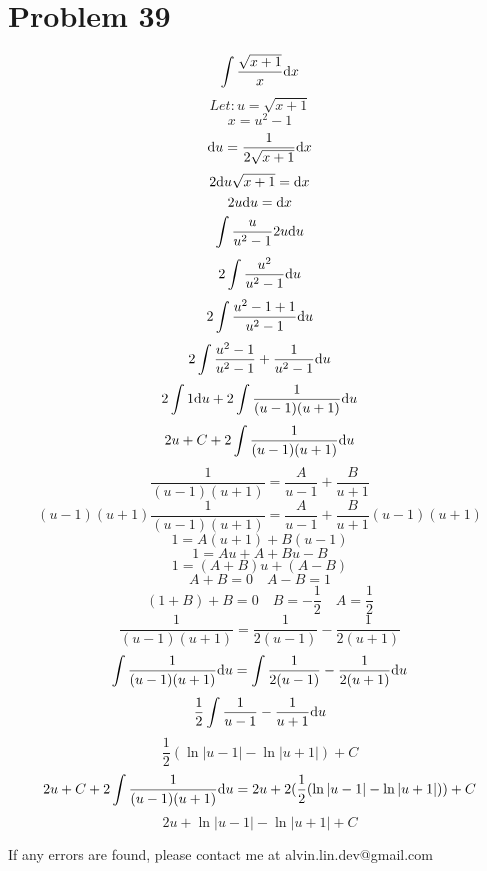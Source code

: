 \documentclass[letterpaper, 12pt]{math}
\begin{document}
\section*{Problem 39}
\[ \int{\frac{\sqrt{x+1}}{x}\mathrm{d}{x}} \]
\[ Let: u = \sqrt{x+1} \]
\[ x = u^{2}-1 \]
\[ \mathrm{d}{u} = \frac{1}{2\sqrt{x+1}}\mathrm{d}{x} \]
\[ 2\mathrm{d}{u}\sqrt{x+1} = \mathrm{d}{x} \]
\[ 2u\mathrm{d}{u} = \mathrm{d}{x} \]
\[ \int{\frac{u}{u^{2}-1}2u\mathrm{d}{u}} \]
\[ 2\int{\frac{u^{2}}{u^{2}-1}\mathrm{d}{u}} \]
\[ 2\int{\frac{u^{2}-1+1}{u^{2}-1}\mathrm{d}{u}} \]
\[ 2\int{\frac{u^{2}-1}{u^{2}-1}+\frac{1}{u^{2}-1}\mathrm{d}{u}} \]
\[ 2\int{1\mathrm{d}{u}}+2\int{\frac{1}{(u-1)(u+1)}\mathrm{d}{u}} \]
\[ 2u+C+2\int{\frac{1}{(u-1)(u+1)}\mathrm{d}{u}} \]
\[ \frac{1}{(u-1)(u+1)} = \frac{A}{u-1}+\frac{B}{u+1} \]
\[ (u-1)(u+1)\frac{1}{(u-1)(u+1)} = \frac{A}{u-1}+\frac{B}{u+1}(u-1)(u+1) \]
\[ 1 = A(u+1)+B(u-1) \]
\[ 1 = Au+A+Bu-B \]
\[ 1 = (A+B)u+(A-B) \]
\[ A+B = 0 \quad A-B = 1 \]
\[ (1+B)+B = 0 \quad B = -\frac{1}{2} \quad A = \frac{1}{2} \]
\[ \frac{1}{(u-1)(u+1)} = \frac{1}{2(u-1)}-\frac{1}{2(u+1)} \]
\[ \int{\frac{1}{(u-1)(u+1)}\mathrm{d}{u}} =
   \int{\frac{1}{2(u-1)}-\frac{1}{2(u+1)}\mathrm{d}{u}} \]
\[ \frac{1}{2}\int{\frac{1}{u-1}-\frac{1}{u+1}\mathrm{d}{u}} \]
\[ \frac{1}{2}(\ln|u-1|-\ln|u+1|)+C \]
\[ 2u+C+2\int{\frac{1}{(u-1)(u+1)}\mathrm{d}{u}} =
   2u+2(\frac{1}{2}(\ln|u-1|-\ln|u+1|))+C \]
\[ 2u+\ln|u-1|-\ln|u+1|+C \]

\begin{center}
  If any errors are found, please contact me at alvin.lin.dev@gmail.com
\end{center}
\end{document}
